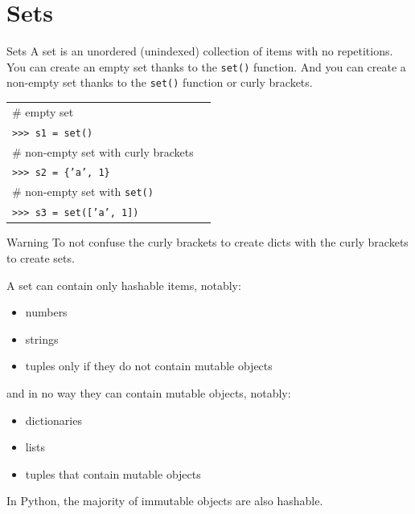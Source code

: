 \documentclass[t,handout,9pt]{beamer}
\begin{document}
\section{Sets}
\begin{frame}{Sets}
	\vfill
A set is an unordered (unindexed) collection of items with no repetitions.
	\vfill
	You can create an empty set thanks to the \texttt{set()} function.
	\vfill
	And you can create a non-empty set thanks to the \texttt{set()} function or curly brackets.
\vfill
\begin{table}[]
	\begin{flushleft}
	\begin{tabular}{ll}
	\# empty set& \\
	\texttt{>{}>{}> s1 = set()} & \\
	\# non-empty set with curly brackets & \\
	\texttt{>{}>{}> s2 = \{'a', 1\}} & \\
	\# non-empty set with \texttt{set()}\\
	\texttt{>{}>{}> s3 = set(['a', 1])} & \\
	\end{tabular}
	\end{flushleft}
\end{table}
\vfill
\begin{block}{Warning}
	To not confuse the curly brackets to create dicts with the curly brackets to create sets.
	\end{block}
	\vfill
\end{frame}
%
\begin{frame}
\vfill
A set can contain only hashable items, notably:
\begin{itemize}
	\item numbers
	\item strings
	\item tuples only if they do not contain mutable objects
\end{itemize}
and in no way they can contain mutable objects, notably:
\begin{itemize}
	\item dictionaries
	\item lists
	\item tuples that contain mutable objects
\end{itemize}
\vfill
In Python, the majority of immutable objects are also hashable.
\vfill
\end{frame}
%
\end{document}
